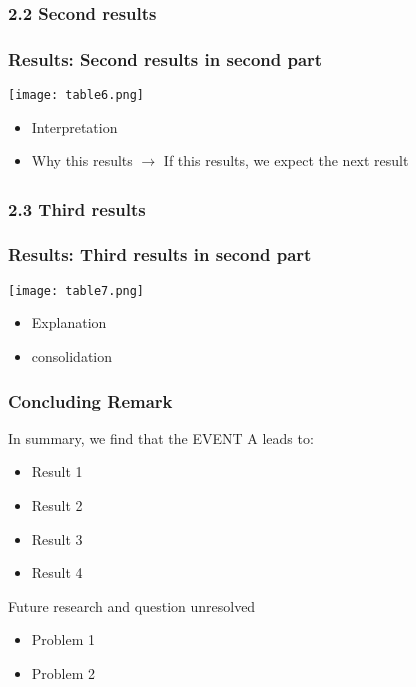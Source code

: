 \documentclass{beamer}
\begin{document}
\subsubsection{2.2 Second results}
\begin{frame}
	\frametitle{Results: Second results in second part}
	\centering	\texttt{[image: table6.png]}\\
	\begin{itemize}
		\item Interpretation
		\item Why this results
			$\xrightarrow[]{}$ If this results, we expect the next
			result
	\end{itemize}
\end{frame}

\subsubsection{2.3 Third results}
\begin{frame}
	\frametitle{Results: Third results in second part}
	\centering \texttt{[image: table7.png]}\\
	\begin{itemize}
		\item Explanation
		\item consolidation
	\end{itemize}
\end{frame}



\begin{frame}
	\frametitle{Concluding Remark}
	In summary, we find that the EVENT A leads to:
	\begin{itemize}
		\item Result 1
		\item Result 2
		\item Result 3
		\item Result 4
	\end{itemize}
	\vspace{4mm}
	Future research and question unresolved
	\begin{itemize}
		\item Problem 1
		\item Problem 2
	\end{itemize}
\end{frame}
\end{document}
